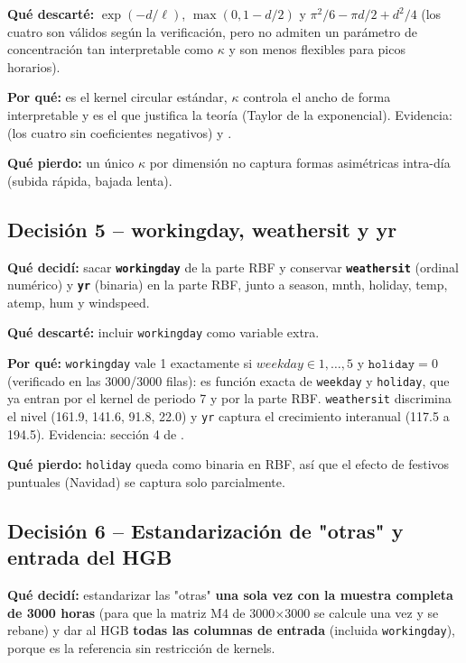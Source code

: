 \textbf{Qué descarté:} $\exp(-d/\ell)$, $\max(0,1-d/2)$ y
$\pi^2/6-\pi d/2+d^2/4$ (los cuatro son válidos según la verificación, pero
no admiten un parámetro de concentración tan interpretable como $\kappa$ y
son menos flexibles para picos horarios).

\textbf{Por qué:} es el kernel circular estándar, $\kappa$ controla el ancho
de forma interpretable y es el que justifica la teoría (Taylor de la
exponencial). Evidencia:  (los
cuatro sin coeficientes negativos) y .

\textbf{Qué pierdo:} un único $\kappa$ por dimensión no captura formas
asimétricas intra-día (subida rápida, bajada lenta).

\subsection*{Decisión 5 -- workingday, weathersit y yr}

\textbf{Qué decidí:} sacar \textbf{\texttt{workingday}} de la parte RBF y
conservar \textbf{\texttt{weathersit}} (ordinal numérico) y
\textbf{\texttt{yr}} (binaria) en la parte RBF, junto a season, mnth,
holiday, temp, atemp, hum y windspeed.

\textbf{Qué descarté:} incluir \texttt{workingday} como variable extra.

\textbf{Por qué:} \texttt{workingday} vale 1 exactamente si $weekday\in
1,\dots,5$ y $\texttt{holiday}=0$ (verificado en las 3000/3000 filas): es
función exacta de \texttt{weekday} y \texttt{holiday}, que ya entran por el
kernel de periodo 7 y por la parte RBF. \texttt{weathersit} discrimina el
nivel (161.9, 141.6, 91.8, 22.0) y \texttt{yr} captura el crecimiento
interanual (117.5 a 194.5). Evidencia: sección 4 de
.

\textbf{Qué pierdo:} \texttt{holiday} queda como binaria en RBF, así que el
efecto de festivos puntuales (Navidad) se captura solo parcialmente.

\subsection*{Decisión 6 -- Estandarización de "otras" y entrada del HGB}

\textbf{Qué decidí:} estandarizar las "otras" \textbf{una sola vez con la
muestra completa de 3000 horas} (para que la matriz M4 de 3000$\times$3000 se
calcule una vez y se rebane) y dar al HGB \textbf{todas las columnas de
entrada} (incluida \texttt{workingday}), porque es la referencia sin
restricción de kernels.

